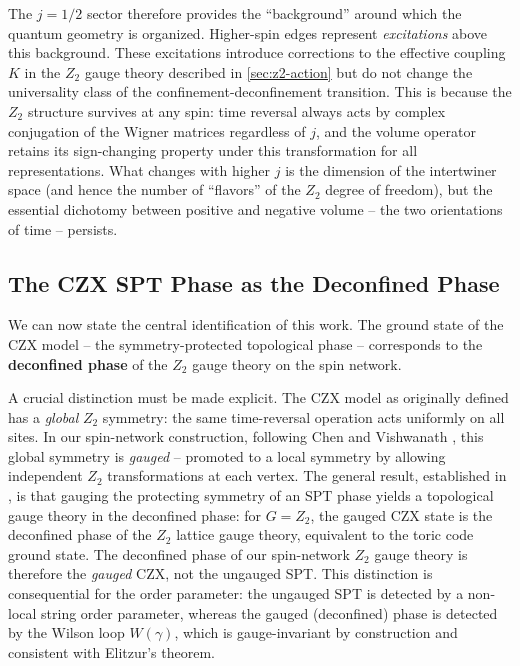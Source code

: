 The $ j = 1/2 $ sector therefore provides the ``background'' around which the quantum geometry is organized. Higher-spin edges represent \emph{excitations} above this background. These excitations introduce corrections to the effective coupling $ K $ in the $ Z_2 $ gauge theory described in \autoref{sec:z2-action} but do not change the universality class of the confinement-deconfinement transition. This is because the $ Z_2 $ structure survives at any spin: time reversal always acts by complex conjugation of the Wigner matrices regardless of $ j $, and the volume operator retains its sign-changing property under this transformation for all representations. What changes with higher $ j $ is the dimension of the intertwiner space (and hence the number of ``flavors'' of the $ Z_2 $ degree of freedom), but the essential dichotomy between positive and negative volume -- the two orientations of time -- persists.

\subsection{The CZX SPT Phase as the Deconfined Phase}\label{subsec:spt-deconfined}

We can now state the central identification of this work. The ground state of the CZX model -- the symmetry-protected topological phase -- corresponds to the \textbf{deconfined phase} of the $ Z_2 $ gauge theory on the spin network.

A crucial distinction must be made explicit. The CZX model as originally defined \cite{Chen2011Symmetry,Chen2010Local} has a \emph{global} $ Z_2 $ symmetry: the same time-reversal operation acts uniformly on all sites. In our spin-network construction, following Chen and Vishwanath \cite{Chen2015Gauging}, this global symmetry is \emph{gauged} -- promoted to a local symmetry by allowing independent $ Z_2 $ transformations at each vertex. The general result, established in \cite{Levin2012Braiding,Haegeman2015Gauging}, is that gauging the protecting symmetry of an SPT phase yields a topological gauge theory in the deconfined phase: for $ G = Z_2 $, the gauged CZX state is the deconfined phase of the $ Z_2 $ lattice gauge theory, equivalent to the toric code ground state. The deconfined phase of our spin-network $ Z_2 $ gauge theory is therefore the \emph{gauged} CZX, not the ungauged SPT. This distinction is consequential for the order parameter: the ungauged SPT is detected by a non-local string order parameter, whereas the gauged (deconfined) phase is detected by the Wilson loop $ W(\gamma) $, which is gauge-invariant by construction and consistent with Elitzur's theorem.


